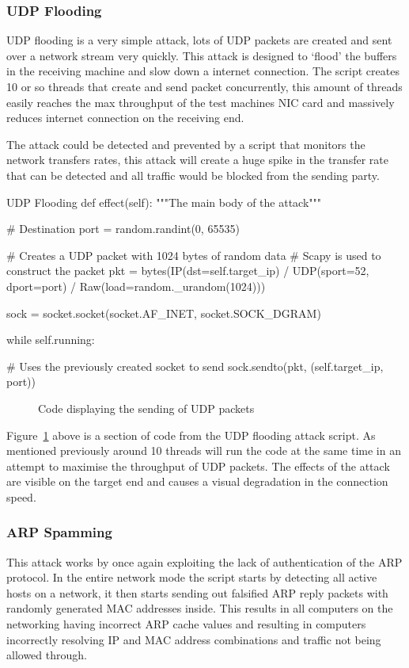 \subsubsection{UDP Flooding}
UDP flooding is a very simple attack, lots of UDP packets are created and sent over a network stream very quickly. This attack is designed to `flood' the buffers in the receiving machine and slow down a internet connection. The script creates 10 or so threads that create and send packet concurrently, this amount of threads easily reaches the max throughput of the test machines NIC card and massively reduces internet connection on the receiving end.

The attack could be detected and prevented by a script that monitors the network transfers rates, this attack will create a huge spike in the transfer rate that can be detected and all traffic would be blocked from the sending party.

\begin{Code}{UDP Flooding}
  def effect(self):
        """The main body of the attack"""

        # Destination
        port = random.randint(0, 65535)

        # Creates a UDP packet with 1024 bytes of random data
        # Scapy is used to construct the packet
        pkt = bytes(IP(dst=self.target_ip) / UDP(sport=52, dport=port) / 
        			Raw(load=random._urandom(1024)))

        sock = socket.socket(socket.AF_INET, socket.SOCK_DGRAM)

        while self.running:

            # Uses the previously created socket to send
            sock.sendto(pkt, (self.target_ip, port))
			
\end{Code}
\begin{figure}[h]
	\caption{Code displaying the sending of UDP packets}
	\label{ref:UdpFloodingFigure}
\end{figure}

Figure~\ref{ref:UdpFloodingFigure} above is a section of code from the UDP flooding attack script. As mentioned previously around 10 threads will run the code at the same time in an attempt to maximise the throughput of UDP packets. The effects of the attack are visible on the target end and causes a visual degradation in the connection speed.

\subsubsection{ARP Spamming}
This attack works by once again exploiting the lack of authentication of the ARP protocol. In the entire network mode the script starts by detecting all active hosts on a network, it then starts sending out falsified ARP reply packets with randomly generated MAC addresses inside. This results in all computers on the networking having incorrect ARP cache values and resulting in computers incorrectly resolving IP and MAC address combinations and traffic not being allowed through.

